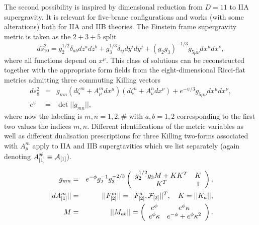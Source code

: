 \documentclass[a4paper,12pt]{article}
\begin{document}
The second possibility is inspired by dimensional reduction from
$D=11$ to IIA supergravity. It is relevant for five-brane
configurations and works (with some alterations) both for IIA and
IIB theories. The Einstein frame supergravity metric is taken as
the $2+3+5$ split
\begin{equation}
d \hat s_{10}^2 = g_2^{1/2} \delta_{ab} dz^a dz^b + g_3^{1/3}
\delta_{ij} dy^i dy^j + (g_2 g_3)^{-1/3} g_{5\mu\nu} dx^\mu
dx^\nu,
\end{equation}
where all functions depend on $x^\mu$. This class of solutions
can be reconstructed together with the appropriate form fields
from the eight-dimensional Ricci-flat metrics admitting three
commuting Killing vectors
\begin{eqnarray}
ds_8^2 &=& g_{mn} \left( d\zeta^m + A^m_\mu dx^\mu \right) \left(
d\zeta^n + A^n_\nu dx^\nu \right) + e^{-\psi/3} g_{5\mu\nu}
dx^\mu dx^\nu, \nonumber\\
e^\psi &=& \det ||g_{mn}||, \label{hab8}
\end{eqnarray}
where now the labeling is $m,n=1,2,\#$ with $a,b=1,2$
corresponding to the first two values the indices $m,n$.
Different identifications of the metric variables as well as
different dualisation prescriptions for three Killing two-forms
associated with $A^m_\mu$ apply to IIA and IIB supergtavities
which we list separately (again denoting $A^{\#}_{[1]}\equiv{\cal
A}_{[1]}$).

\bigskip
{} \nopagebreak
\begin{eqnarray}
g_{mn} &=& e^{-\phi} g_2^{-1} g_3^{-2/3}
  \left( \begin{array}{cc} g_2^{1/2}g_3M + KK^T &  K \\
  K^T & 1 \end{array} \right), \nonumber \\
||dA^m_{[1]}|| &=& ||F^m_{[2]}|| = ||F^a_{[2]},{\cal F}_{[2]}||^T,
\quad K = ||K_a||, \nonumber\\
M &=& ||M_{ab}|| =
  \left( \begin{array}{cc} e^{\phi} &  e^{\phi}\kappa \\
  e^{\phi}\kappa & e^{-\phi}+e^{\phi}\kappa^2
  \end{array}\right).
\end{eqnarray}
\end{document}
